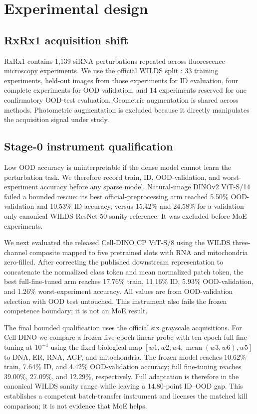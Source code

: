 \section{Experimental design}

\subsection{RxRx1 acquisition shift}
RxRx1 contains 1,139 siRNA perturbations repeated across fluorescence-microscopy experiments. We
use the official WILDS split \citep{koh2021wilds}: 33 training experiments, held-out images from
those experiments for ID evaluation, four complete experiments for OOD validation, and 14
experiments reserved for one confirmatory OOD-test evaluation. Geometric augmentation is shared
across methods. Photometric augmentation is excluded because it directly manipulates the
acquisition signal under study.

\subsection{Stage-0 instrument qualification}
Low OOD accuracy is uninterpretable if the dense model cannot learn the perturbation task. We
therefore record train, ID, OOD-validation, and worst-experiment accuracy before any sparse model.
Natural-image DINOv2 ViT-S/14 failed a bounded rescue: its best official-preprocessing arm reached
5.50\% OOD-validation and 10.53\% ID accuracy, versus 15.42\% and 24.58\% for a validation-only
canonical WILDS ResNet-50 sanity reference. It was excluded before MoE experiments.

We next evaluated the released Cell-DINO CP ViT-S/8 using the WILDS three-channel composite mapped
to five pretrained slots with RNA and mitochondria zero-filled. After correcting the published
downstream representation to concatenate the normalized class token and mean normalized patch
token, the best full-fine-tuned arm reaches 17.76\% train, 11.16\% ID, 5.93\% OOD-validation, and
1.26\% worst-experiment accuracy. All values are from OOD-validation selection with OOD test
untouched. This instrument also fails the frozen competence boundary; it is not an MoE result.

The final bounded qualification uses the official six grayscale acquisitions. For Cell-DINO we
compare a frozen five-epoch linear probe with ten-epoch full fine-tuning at $10^{-4}$ using the
fixed biological map
$[w1,w2,w4,\operatorname{mean}(w3,w6),w5]$ to DNA, ER, RNA, AGP, and mitochondria.
The frozen model reaches 10.62\% train, 7.64\% ID, and 4.42\% OOD-validation accuracy; full
fine-tuning reaches 39.00\%, 27.09\%, and 12.29\%, respectively. Full adaptation is therefore in
the canonical WILDS sanity range while leaving a 14.80-point ID--OOD gap. This establishes a
competent batch-transfer instrument and licenses the matched kill comparison; it is not evidence
that MoE helps.

